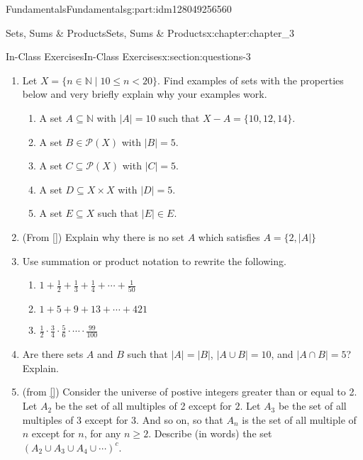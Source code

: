 \documentclass[oneside,10pt,]{book}
\newcommand{\xreffont}{\relax}
\numberwithin{equation}{section}
\newcommand{\card}[1]{\left| #1 \right|}
\newcommand{\lt}{<}
\begin{document}
\begin{partptx}{Fundamentals}{}{Fundamentals}{}{}{g:part:idm128049256560}
\begin{chapterptx}{Sets, Sums \& Products}{}{Sets, Sums \& Products}{}{}{x:chapter:chapter_3}
\typeout{************************************************}
%
\begin{sectionptx}{In-Class Exercises}{}{In-Class Exercises}{}{}{x:section:questions-3}
%
\begin{enumerate}[label=\arabic*.]
\item{}Let \(X = \{n \in \mathbb{N} \mid 10 \leq n \lt 20\}\).  Find examples of sets with the properties below and very briefly explain why your examples work.%
\begin{enumerate}[label=(\alph*)]
\item{}A set \(A \subseteq \mathbb{N}\) with \(\lvert A \rvert = 10\) such that \(X - A = \{10, 12, 14\}\).%
\item{}A set \(B \in \mathcal{P}(X)\) with \(\lvert B\rvert = 5\).%
\item{}A set \(C \subseteq \mathcal{P}(X)\) with \(\lvert C\rvert = 5\).%
\item{}A set \(D \subseteq X \times X\) with \(\lvert D\rvert = 5\).%
\item{}A set \(E \subseteq X\) such that \(\lvert E\rvert \in E\).%
\end{enumerate}
%
\item{}(From \hyperlink{x:biblio:biblio-levin-2020}{[{\xreffont 3}]}) Explain why there is no set \(A\) which satisfies \(A = \{2, \card{A}\}\)%
\item{}Use summation or product notation to rewrite the following.%
\begin{enumerate}[label=(\alph*)]
\item{}\(\displaystyle 1 + \frac{1}{2} + \frac{1}{3}+ \frac{1}{4}+ \cdots + \frac{1}{50}\)%
\item{}\(\displaystyle 1 + 5 + 9 + 13 + \cdots + 421\)%
\item{}\(\displaystyle \frac{1}{2}\cdot \frac{3}{4}\cdot \frac{5}{6}\cdot \cdots 			 
\cdot\frac{99}{100}\)%
\end{enumerate}
%
\item{}Are there sets \(A\) and \(B\) such that \(|A| = |B|\), \(|A\cup B| = 10\), and \(|A\cap B| = 5\)?  Explain.%
\item{}(from \hyperlink{x:biblio:biblio-levin-2020}{[{\xreffont 3}]}) Consider the universe of postive integers greater than or equal to 2. Let \(A_2\) be the set of all multiples of 2 except for \(2\). Let \(A_3\) be the set of all multiples of 3 except for 3. And so on, so that \(A_n\) is the set of all multiple of \(n\) except for \(n\), for any \(n \ge 2\). Describe (in words) the set \(\left(A_2 \cup A_3 \cup A_4 \cup \cdots \right)^c\).%

\end{enumerate}
\end{sectionptx}
\end{chapterptx}
\end{partptx}
\end{document}
